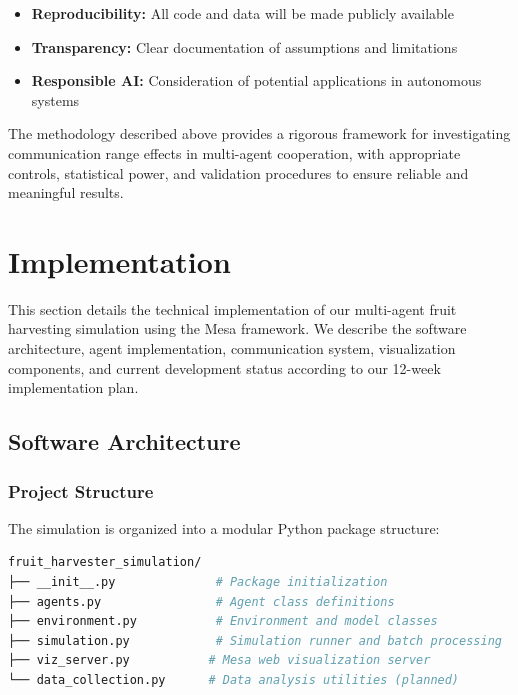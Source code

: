 \documentclass[12pt,a4paper]{article}
\begin{document}
\begin{itemize}
    \item \textbf{Reproducibility:} All code and data will be made publicly available
    \item \textbf{Transparency:} Clear documentation of assumptions and limitations
    \item \textbf{Responsible AI:} Consideration of potential applications in autonomous systems
\end{itemize}

The methodology described above provides a rigorous framework for investigating communication range effects in multi-agent cooperation, with appropriate controls, statistical power, and validation procedures to ensure reliable and meaningful results.

\section{Implementation}
\label{sec:implementation}

This section details the technical implementation of our multi-agent fruit harvesting simulation using the Mesa framework. We describe the software architecture, agent implementation, communication system, visualization components, and current development status according to our 12-week implementation plan.

\subsection{Software Architecture}

\subsubsection{Project Structure}

The simulation is organized into a modular Python package structure:

\begin{lstlisting}[language=bash, caption=Project Directory Structure]
fruit_harvester_simulation/
├── __init__.py              # Package initialization
├── agents.py                # Agent class definitions
├── environment.py           # Environment and model classes
├── simulation.py            # Simulation runner and batch processing
├── viz_server.py           # Mesa web visualization server
└── data_collection.py      # Data analysis utilities (planned)
\end{lstlisting}
\end{document}
